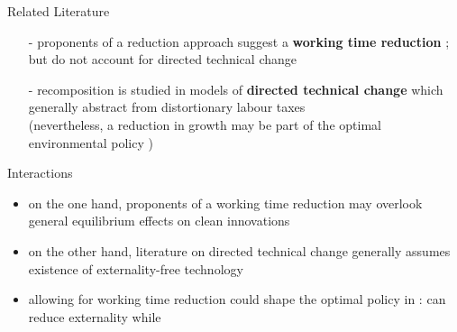 \documentclass[11pt,aspectratio=169]{beamer}
\begin{document}
\begin{frame}{Related Literature}
\begin{itemize}
	\item[-] proponents of a reduction approach suggest a \textbf{\alert{working time reduction}} \citep{Schor2005SustainableReduction, Pullinger2014WorkingDesign}; but do not account for directed technical change
	\vspace{3mm}
	\item[-] recomposition is studied in models of \textbf{\alert{directed technical change}} which generally abstract from distortionary labour taxes\\ (nevertheless, a reduction in growth may be part of the optimal environmental policy \citep[e.g.][]{Acemoglu2012TheChange})
\end{itemize}
\end{frame}
\begin{frame}{Interactions}
\begin{itemize}
\item on the one hand, proponents of a working time reduction may overlook general equilibrium effects on clean innovations
\item on the other hand, literature on directed technical change generally assumes existence of externality-free technology
\item allowing for working time reduction could shape the optimal policy in \cite{Acemoglu2012TheChange}: can reduce externality while
	\end{itemize}
\end{frame}
\end{document}
